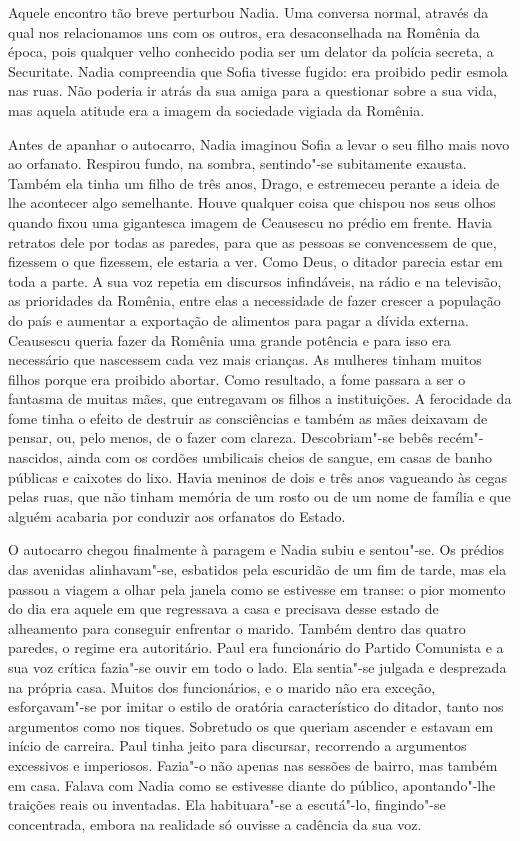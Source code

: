 Aquele encontro tão breve perturbou Nadia. Uma conversa normal,
através da qual nos relacionamos uns com os outros, era desaconselhada
na Romênia da época, pois qualquer velho conhecido podia ser um delator
da polícia secreta, a Securitate. Nadia compreendia que Sofia tivesse
fugido: era proibido pedir esmola nas ruas. Não poderia ir atrás da sua
amiga para a questionar sobre a sua vida, mas aquela atitude era a
imagem da sociedade vigiada da Romênia.

Antes de apanhar o autocarro, Nadia imaginou Sofia a levar o seu filho
mais novo ao orfanato. Respirou fundo, na sombra, sentindo"-se
subitamente exausta. Também ela tinha um filho de três anos, Drago, e
estremeceu perante a ideia de lhe acontecer algo semelhante. Houve
qualquer coisa que chispou nos seus olhos quando fixou uma gigantesca
imagem de Ceausescu no prédio em frente. Havia retratos dele por todas
as paredes, para que as pessoas se convencessem de que, fizessem o que
fizessem, ele estaria
a ver. Como Deus, o ditador parecia estar em toda a parte. A sua voz
repetia em discursos infindáveis, na rádio e na televisão, as
prioridades da Romênia, entre elas a necessidade de fazer crescer a
população do país e aumentar a exportação de alimentos para pagar a
dívida externa. Ceausescu queria fazer da Romênia uma grande potência e
para isso era necessário que nascessem cada vez mais crianças. As
mulheres tinham muitos filhos porque era proibido abortar. Como
resultado, a fome passara a ser o fantasma de muitas mães, que
entregavam os filhos a instituições. A ferocidade da fome tinha o
efeito de destruir as consciências e também as mães deixavam de pensar,
ou, pelo menos, de o fazer com clareza. Descobriam"-se bebês
recém"-nascidos, ainda com os cordões umbilicais cheios de sangue, em
casas de banho públicas e caixotes do lixo. Havia meninos de dois e três
anos vagueando às cegas pelas ruas, que não tinham memória de um rosto
ou de um nome de família e que alguém acabaria por conduzir aos
orfanatos do Estado.

O autocarro chegou finalmente à paragem e Nadia
subiu e sentou"-se. Os prédios das avenidas alinhavam"-se, esbatidos pela
escuridão de um fim de tarde, mas ela passou a viagem a olhar pela
janela como se estivesse em transe: o pior momento do dia era aquele em
que regressava a casa e precisava desse estado de alheamento para
conseguir enfrentar o marido. Também dentro das quatro paredes, o regime
era autoritário. Paul era funcionário do Partido Comunista e a sua voz
crítica fazia"-se ouvir em todo o lado. Ela sentia"-se julgada e
desprezada na própria casa. Muitos dos funcionários, e o marido não era
exceção,
esforçavam"-se por imitar o estilo de oratória característico do ditador,
tanto nos argumentos como nos tiques. Sobretudo os que queriam
ascender e estavam em início de carreira. Paul tinha jeito para
discursar, recorrendo a argumentos excessivos e imperiosos. Fazia"-o não
apenas nas sessões de bairro, mas também em casa. Falava com Nadia como
se estivesse diante do público, apontando"-lhe traições reais ou
inventadas. Ela habituara"-se a escutá"-lo, fingindo"-se concentrada,
embora na realidade só ouvisse a cadência da sua voz.

